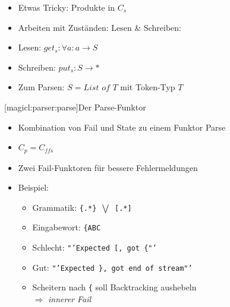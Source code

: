 \documentclass[a4paper, bibgerm]{article}
\newcommand\lsubsubsection{}
\begin{document}
  \begin{itemize}
  \item Etwas Tricky: Produkte in $C_{s}$
  \item Arbeiten mit Zuständen: Lesen \& Schreiben:
  \item Lesen: $get_s : \forall a : a \rightarrow S$
  \item Schreiben: $put_s : S \rightarrow *$
  \item Zum Parsen: $S = List$ $of$ $T$ mit Token-Typ $T$
  \end{itemize}

\lsubsubsection[magicl:parser:parse]{Der Parse-Funktor}

  \begin{itemize}
  \item Kombination von Fail und State zu einem Funktor Parse
  \item $C_p = C_{ffs}$
  \item Zwei Fail-Funktoren für bessere Fehlermeldungen
  \item Beispiel:
    \begin{itemize}
    \item Grammatik: \texttt{\{.*\} $\bigvee$ [.*]}
    \item Eingabewort: \texttt{\{ABC}
    \item Schlecht: \texttt{"'Expected [, got \{"'}
    \item Gut: \texttt{"'Expected \}, got end of stream"'}
    \item Scheitern nach \texttt{\{} soll Backtracking aushebeln \\
      $\Rightarrow$ \textit{innerer Fail}
    \end{itemize}
  \end{itemize}
\end{document}
